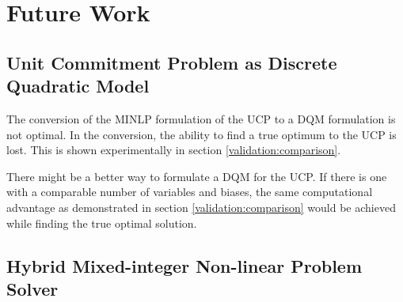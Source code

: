 \section{Future Work}

\subsection{Unit Commitment Problem as Discrete Quadratic Model}

The conversion of the MINLP formulation of the UCP to a DQM formulation is not optimal.
In the conversion, the ability to find a true optimum to the UCP is lost.
This is shown experimentally in section \ref{validation:comparison}.

There might be a better way to formulate a DQM for the UCP.
If there is one with a comparable number of variables and biases, the same computational advantage as demonstrated in section \ref{validation:comparison} would be achieved while finding the true optimal solution.

\subsection{Hybrid Mixed-integer Non-linear Problem Solver}
